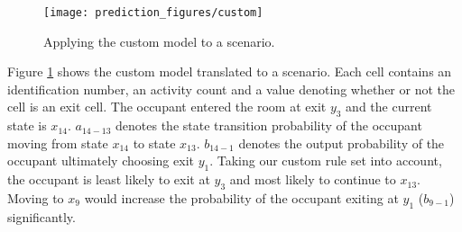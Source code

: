 \begin{figure}[htb]
	\centering
	\texttt{[image: prediction\_figures/custom]}
	\caption{Applying the custom model to a scenario.}
	\label{fig:custom_model}
\end{figure}

Figure \ref{fig:custom_model} shows the custom model translated to a scenario. Each cell contains an identification number, an activity count and a value denoting whether or not the cell is an exit cell. The occupant entered the room at exit \(y_3\) and the current state is \(x_{14}\). \(a_{14-13}\) denotes the state transition probability of the occupant moving from state \(x_{14}\) to state \(x_{13}\). \(b_{14-1}\) denotes the output probability of the occupant ultimately choosing exit \(y_{1}\). Taking our custom rule set into account, the occupant is least likely to exit at \(y_3\) and most likely to continue to \(x_{13}\). Moving to \(x_9\) would increase the probability of the occupant exiting at \(y_{1}\) (\(b_{9-1}\)) significantly.